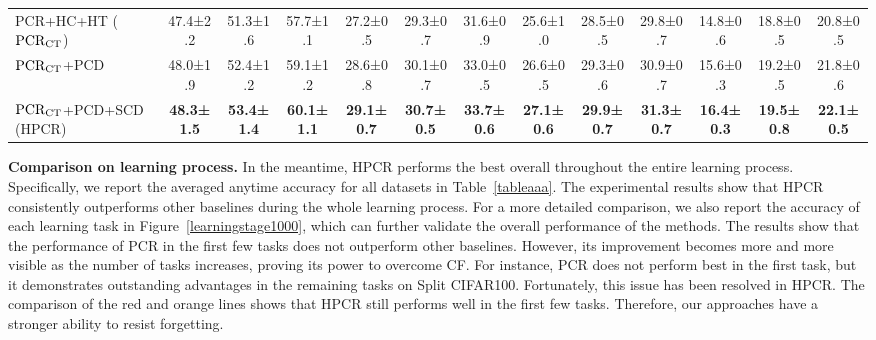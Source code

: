 \begin{table}[t]
\begin{tabular}{l|ccc|ccc|ccc|ccc}
PCR+HC+HT ($\rm PCR_{CT}$)    & {47.4\scriptsize±2.2}& {51.3\scriptsize±1.6}                & {57.7\scriptsize±1.1}                 & {27.2\scriptsize±0.5}                &{29.3\scriptsize±0.7}                 & {31.6\scriptsize±0.9} & {25.6\scriptsize±1.0}                   & {28.5\scriptsize±0.5}                  & {29.8\scriptsize±0.7} & {14.8\scriptsize±0.6}                   & {18.8\scriptsize±0.5}                  & {20.8\scriptsize±0.5}\\
$\rm PCR_{CT}$+PCD    & 48.0\scriptsize±1.9& 52.4\scriptsize±1.2                & 59.1\scriptsize±1.2                 & 28.6\scriptsize±0.8           & 30.1\scriptsize±0.7          & 33.0\scriptsize±0.5 & 26.6\scriptsize±0.5                   & 29.3\scriptsize±0.6                  & 30.9\scriptsize±0.7                   & 15.6\scriptsize±0.3                  & 19.2\scriptsize±0.5                  & 21.8\scriptsize±0.6\\
$\rm PCR_{CT}$+PCD+SCD (HPCR)    & \textbf{48.3\scriptsize±1.5}& \textbf{53.4\scriptsize±1.4}                & \textbf{60.1\scriptsize±1.1}                 & \textbf{29.1\scriptsize±0.7}                &\textbf{30.7\scriptsize±0.5}                 & \textbf{33.7\scriptsize±0.6} & \textbf{27.1\scriptsize±0.6}                   & \textbf{29.9\scriptsize±0.7}                  & \textbf{31.3\scriptsize±0.7} & \textbf{16.4\scriptsize±0.3}                   & \textbf{19.5\scriptsize±0.8}                  & \textbf{22.1\scriptsize±0.5}\\
\hline
\end{tabular}
\vspace{-3ex}
\end{table}



\textbf{Comparison on learning process.} In the meantime, HPCR performs the best overall throughout the entire learning process. Specifically, we report the averaged anytime accuracy for all datasets in Table~\ref{tableaaa}. The experimental results show that HPCR consistently outperforms other baselines during the whole learning process. For a more detailed comparison, we also report the accuracy of each learning task in Figure~\ref{learningstage1000}, which can further validate the overall performance of the methods. The results show that the performance of PCR in the first few tasks does not outperform other baselines. However, its improvement becomes more and more visible as the number of tasks increases, proving its power to overcome CF. For instance, PCR does not perform best in the first task, but it demonstrates outstanding advantages in the remaining tasks on Split CIFAR100. Fortunately, this issue has been resolved in HPCR. The comparison of the red and orange lines shows that HPCR still performs well in the first few tasks. Therefore, our approaches have a stronger ability to resist forgetting.

